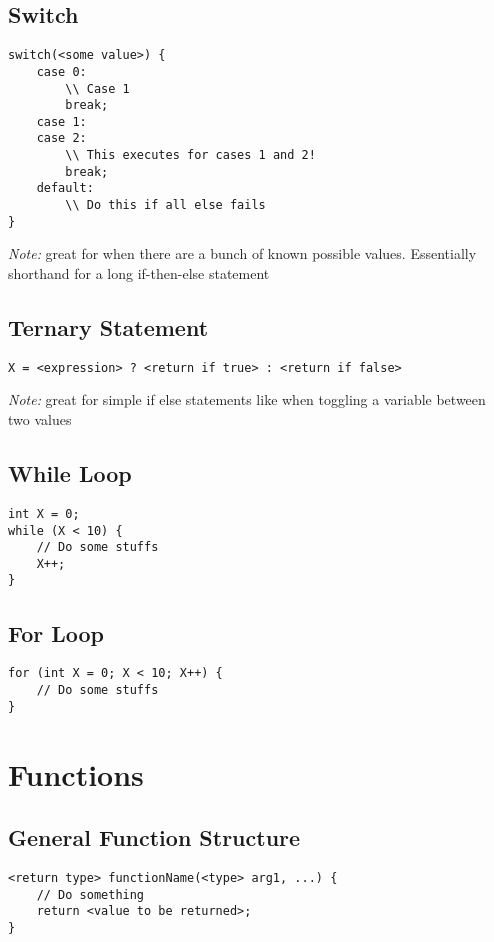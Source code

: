 \documentclass{article}
\begin{document}
\subsection{Switch}
\begin{lstlisting}
switch(<some value>) {
	case 0:
		\\ Case 1
		break;
	case 1:
	case 2:
		\\ This executes for cases 1 and 2!
		break;
	default:
		\\ Do this if all else fails
}
\end{lstlisting}
\emph{Note:} great for when there are a bunch of known possible values. Essentially shorthand for a long if-then-else statement

\subsection{Ternary Statement}
\begin{lstlisting}
X = <expression> ? <return if true> : <return if false>
\end{lstlisting}
\emph{Note:} great for simple if else statements like when toggling a variable between two values

\subsection{While Loop}
\begin{lstlisting}
int X = 0;
while (X < 10) {
	// Do some stuffs
	X++;
}
\end{lstlisting}

\subsection{For Loop}
\begin{lstlisting}
for (int X = 0; X < 10; X++) {
	// Do some stuffs
}
\end{lstlisting}

\section{Functions}

\subsection{General Function Structure}
\begin{lstlisting}
<return type> functionName(<type> arg1, ...) {
	// Do something
	return <value to be returned>;
}
\end{lstlisting}
\end{document}
